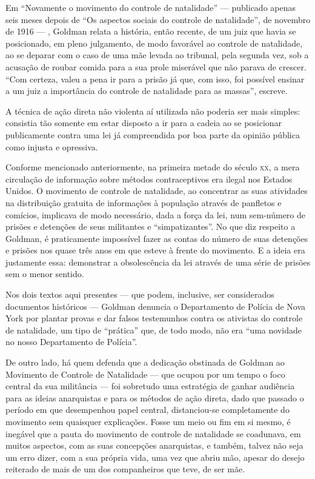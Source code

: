 Em
``Novamente o movimento do controle de natalidade'' --- publicado apenas
seis meses depois de ``Os aspectos sociais do controle de natalidade'', de
novembro de 1916 --- , Goldman relata a história, então recente, de um
juiz que havia se posicionado, em pleno julgamento, de modo favorável ao
controle de natalidade, ao se deparar com o caso de uma mãe levada ao
tribunal, pela segunda vez, sob a acusação de roubar comida para a sua
prole miserável que não parava de crescer. ``Com certeza, valeu a pena
ir para a prisão já que, com isso, foi possível ensinar a um juiz a
importância do controle de natalidade para as massas'', escreve.

A técnica de ação direta não violenta aí utilizada não
poderia ser mais simples: consistia tão somente em estar disposto a ir
para a cadeia ao se posicionar publicamente contra uma lei já
compreendida por boa parte da opinião pública como injusta e opressiva.

Conforme mencionado anteriormente, na primeira metade do século \textsc{xx}, a
mera circulação de informação sobre métodos contraceptivos era
ilegal nos Estados Unidos. O movimento de controle de
natalidade, ao concentrar as suas atividades na distribuição gratuita de
informações à população através de panfletos e comícios, implicava de
modo necessário, dada a força da lei, num sem-número de prisões e
detenções de seus militantes e ``simpatizantes''. No que diz
respeito a Goldman, é praticamente impossível fazer as contas do número
de suas detenções e prisões nos quase três anos em que esteve à frente
do movimento. E a ideia era justamente essa: demonstrar a obsolescência
da lei através de uma série de prisões sem o menor sentido.

Nos dois textos aqui presentes --- que podem, inclusive, ser considerados
documentos históricos --- Goldman denuncia o Departamento de Polícia de
Nova York por plantar provas e dar falsos testemunhos contra os
ativistas do controle de natalidade, um tipo de ``prática'' que, de todo
modo, não era ``uma novidade no nosso Departamento de
Polícia''.

De outro lado, há quem defenda que a dedicação obstinada de
Goldman ao Movimento de Controle de Natalidade --- que ocupou por um tempo
o foco central da sua militância --- foi
sobretudo uma estratégia de ganhar audiência para as ideias anarquistas
e para os métodos de ação direta, dado que passado o período em que
desempenhou papel central, distanciou-se completamente do movimento sem
quaisquer explicações. Fosse um meio ou fim em si mesmo, é inegável que
a pauta do movimento de controle de natalidade se coadunava, em muitos
aspectos, com as suas concepções anarquistas, e também, talvez não seja
um erro dizer, com a sua própria vida, uma vez que abriu mão, apesar do
desejo reiterado de mais de um dos companheiros que teve, de ser mãe.

